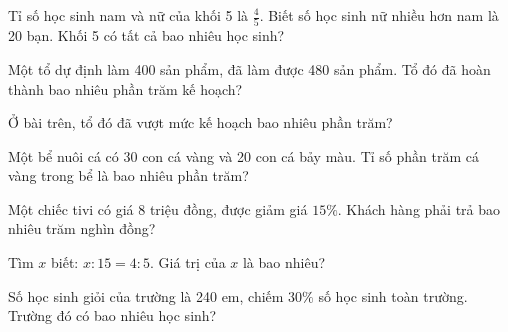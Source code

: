 \begin{ex}
  Tỉ số học sinh nam và nữ của khối 5 là $\frac{4}{5}$. Biết số học sinh nữ nhiều hơn nam là 20 bạn. Khối 5 có tất cả bao nhiêu học sinh?
\end{ex}

\begin{ex}
  Một tổ dự định làm 400 sản phẩm, đã làm được 480 sản phẩm. Tổ đó đã hoàn thành bao nhiêu phần trăm kế hoạch?
\end{ex}

\begin{ex}
  Ở bài trên, tổ đó đã vượt mức kế hoạch bao nhiêu phần trăm?
\end{ex}

\begin{ex}
  Một bể nuôi cá có 30 con cá vàng và 20 con cá bảy màu. Tỉ số phần trăm cá vàng trong bể là bao nhiêu phần trăm?
\end{ex}

\begin{ex}
  Một chiếc tivi có giá 8 triệu đồng, được giảm giá $15\%$. Khách hàng phải trả bao nhiêu trăm nghìn đồng?
\end{ex}

\begin{ex}
  Tìm $x$ biết: $x : 15 = 4 : 5$. Giá trị của $x$ là bao nhiêu?
\end{ex}

\begin{ex}
  Số học sinh giỏi của trường là 240 em, chiếm $30\%$ số học sinh toàn trường. Trường đó có bao nhiêu học sinh?
\end{ex}
